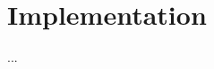 \documentclass[../report.tex]{subfiles}
\begin{document}
\section{Implementation}
...
\end{document}
